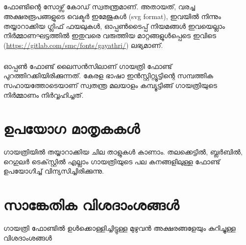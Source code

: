 \documentclass[12pt]{report}
\begin{document}
	\paragraph{}
	ഫോണ്ടിന്റെ സോഴ്സ് കോഡ് സ്വതന്ത്രമാണ്. അതായത്, വരച്ച അക്ഷരരൂപങ്ങളുടെ വെക്ടര്‍ ഇമേജുകള്‍ (svg format), ഇവയില്‍ നിന്നും തയ്യാറാക്കിയ ഗ്ലിഫ് ഫയലുകള്‍, ഓപ്പണ്‍ടൈപ്പ്  നിയമങ്ങള്‍ ഇവയെല്ലാം നിര്‍മ്മാണഘട്ടത്തില്‍ ഇതുവരെ വരുത്തിയ മാറ്റങ്ങളുള്‍പ്പെടെ ഇവിടെ (\url{https://gitlab.com/smc/fonts/gayathri/}) ലഭ്യമാണ്.
	
	\paragraph{}
		ഓപ്പണ്‍ ഫോണ്ട് ലൈസന്‍സിലാണ് ഗായത്രി ഫോണ്ട് പുറത്തിറക്കിയിരിക്കുന്നത്.  കേരള ഭാഷാ ഇൻസ്റ്റിറ്റ്യൂട്ടിന്റെ സമ്പത്തിക സഹായത്തോടെയാണ്  സ്വതന്ത്ര മലയാളം കമ്പ്യൂട്ടിങ്ങ് ഗായത്രിയുടെ നിർമ്മാണം നിർവ്വഹിച്ചത്.
	
	\newpage
	\clearpage
	
	\chapter*{ഉപയോഗ മാതൃകകള്‍‍}
	
	ഗായത്രിയിൽ തയ്യാറാക്കിയ ചില താളുകൾ കാണാം. തലക്കെട്ടിൽ, ബ്ലർബിൽ, റെഗുലർ ടെക്‌സ്റ്റിൽ എല്ലാം ഗായത്രിയുടെ പല കനങ്ങളിലുള്ള  ഫോണ്ട് ഉപയോഗിച്ച് വിന്യസിച്ചിരിക്കുന്നു.

	
	
	
	\chapter*{സാങ്കേതിക വിശദാംശങ്ങള്‍}
	
	ഗായത്രി ഫോണ്ടില്‍ ഉള്‍ക്കൊള്ളിച്ചിട്ടുള്ള മുഴുവന്‍ അക്ഷരങ്ങളേയും കുറിച്ചുള്ള വിശദാംശങ്ങൾ 
	
		
	
	



	

	
\end{document}
